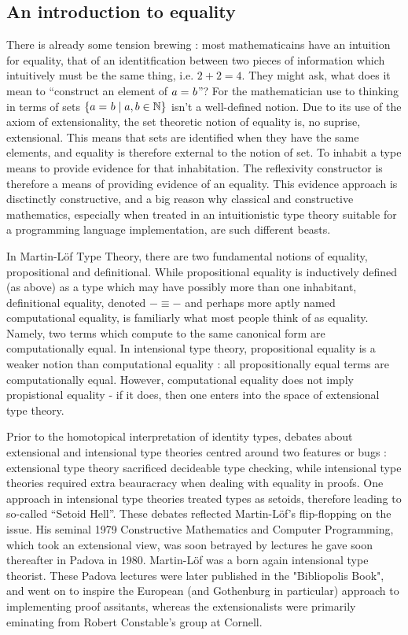 \subsection{An introduction to equality}

There is already some tension brewing : most mathematicains have an intuition
for equality, that of an identitfication between two pieces of information
which intuitively must be the same thing, i.e. $2+2=4$. They might ask, what
does it mean to ``construct an element of $a =_{} b$''? For the mathematician
use to thinking in terms of sets $\{a =_{} b \mid a,b \in \mathbb{N} \}$ isn't
a well-defined notion. Due to its use of the axiom of extensionality, the set
theoretic notion of equality is, no suprise, extensional.  This means that sets
are identified when they have the same elements, and equality is therefore
external to the notion of set. To inhabit a type means to provide evidence for
that inhabitation. The reflexivity constructor is therefore a means of
providing evidence of an equality. This evidence approach is disctinctly
constructive, and a big reason why classical and constructive mathematics,
especially when treated in an intuitionistic type theory suitable for a
programming language implementation, are such different beasts.

In Martin-Löf Type Theory, there are two fundamental notions of equality,
propositional and definitional.  While propositional equality is inductively
defined (as above) as a type which may have possibly more than one inhabitant,
definitional equality, denoted $-\equiv -$ and perhaps more aptly named
computational equality, is familiarly what most people think of as equality.
Namely, two terms which compute to the same canonical form are computationally
equal. In intensional type theory, propositional equality is a weaker notion
than computational equality : all propositionally equal terms are
computationally equal. However, computational equality does not imply
propistional equality - if it does, then one enters into the space of
extensional type theory. 

Prior to the homotopical interpretation of identity types, debates about
extensional and intensional type theories centred around two features or bugs :
extensional type theory sacrificed decideable type checking, while intensional
type theories required extra beauracracy when dealing with equality in proofs.
One approach in intensional type theories treated types as setoids, therefore
leading to so-called ``Setoid Hell''. These debates reflected Martin-Löf's
flip-flopping on the issue. His seminal 1979 Constructive Mathematics and
Computer Programming, which took an extensional view, was soon betrayed by
lectures he gave soon thereafter in Padova in 1980.  Martin-Löf was a born
again intensional type theorist.  These Padova lectures were later published in
the "Bibliopolis Book", and went on to inspire the European (and Gothenburg in
particular) approach to implementing proof assitants, whereas the
extensionalists were primarily eminating from Robert Constable's group at
Cornell. 

